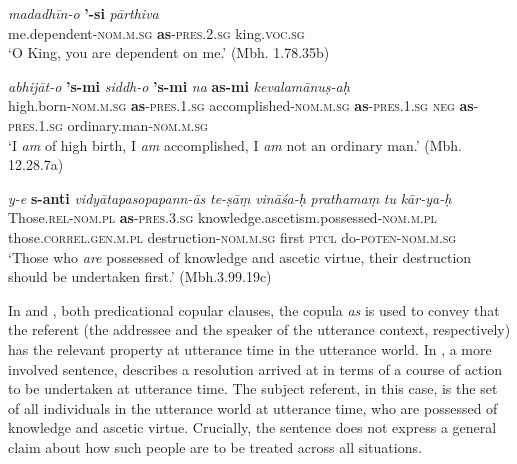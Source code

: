 \documentclass[output=paper,hidelinks]{langscibook}
\begin{document}
\begin{exe}
\begin{xlist}
\begin{xlist}
\begin{exe}
\begin{exe}
\begin{exe}
\begin{exe}
\label{as1}
\ex 
\begin{xlist} 
\ex
\gll \emph{madadhīn-o} \textbf{'-si} \emph{pārthiva}\\
me.dependent-\textsc{nom.m.sg} \textbf{as}-\textsc{pres.2.sg} king.\textsc{voc.sg}\\
\glt `O King, you are dependent on me.' (Mbh. 1.78.35b) \label{dependent}

\ex
\gll \emph{abhijāt-o} \textbf{'s-mi} \emph{siddh-o} \textbf{'s-mi} \emph{na} \textbf{as-mi} \emph{kevalamānu\d{s}-a\d{h}}\\
high.born-\textsc{nom.m.sg} \textbf{as}-\textsc{pres.1.sg} accomplished-\textsc{nom.m.sg} \textbf{as}-\textsc{pres.1.sg} \textsc{neg} \textbf{as}-\textsc{pres.1.sg} ordinary.man-\textsc{nom.m.sg}\\
\glt `I \emph{am} of high birth, I \emph{am} accomplished, I \emph{am} not an ordinary man.' (Mbh. 12.28.7a) \label{highbirth}

\ex
\gll \emph{y-e} \textbf{s-anti} \emph{vidyātapasopapann-ās} \emph{te-\d{s}ā\d{m}} \emph{vinā\'{s}a-\d{h}} \emph{prathama\d{m}} \emph{tu} \emph{kār-ya-\d{h}}\\
Those.\textsc{rel-nom.pl} \textbf{as}-\textsc{pres.3.sg} knowledge.ascetism.possessed-\textsc{nom.m.pl} those.\textsc{correl.gen.m.pl} destruction-\textsc{nom.m.sg} first \textsc{ptcl} do-\textsc{poten-nom.m.sg}\\
\glt `Those who \emph{are} possessed of knowledge and ascetic virtue, their destruction should be undertaken first.' (Mbh.3.99.19c) \label{destruction}
\z
\z

In  and , both predicational copular clauses, the copula \textit{as} is used to convey that the referent (the addressee and the speaker of the utterance context, respectively) has the relevant property at utterance time in the utterance world. In , a more involved sentence, describes a resolution arrived at in terms of a course of action to be undertaken at utterance time. The subject referent, in this case, is the set of all individuals in the utterance world at utterance time, who are possessed of knowledge and ascetic virtue. Crucially, the sentence does not express a general claim about how such people are to be treated across all situations.


\end{xlist}
\end{exe}
\end{exe}
\end{exe}
\end{exe}
\end{xlist}
\end{xlist}
\end{exe}
\end{document}
